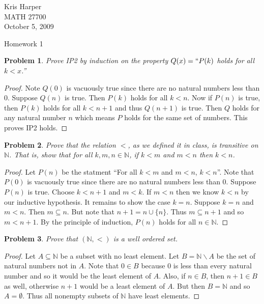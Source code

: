 \documentclass{article}
\newtheorem{problem}{Problem}
\begin{document}
\begin{flushright}
Kris Harper\\

MATH 27700\\

October 5, 2009
\end{flushright}

\begin{center}
Homework 1
\end{center}

\begin{problem}
Prove IP2 by induction on the property $Q(x) = ``P(k)$ holds for all $k < x$.''
\end{problem}
\begin{proof}
Note $Q(0)$ is vacuously true since there are no natural numbers less than $0$. Suppose $Q(n)$ is true. Then $P(k)$ holds for all $k < n$. Now if $P(n)$ is true, then $P(k)$ holds for all $k < n+1$ and thus $Q(n+1)$ is true. Then $Q$ holds for any natural number $n$ which means $P$ holds for the same set of numbers. This proves IP2 holds.
\end{proof}

\begin{problem}
Prove that the relation $<$, as we defined it in class, is transitive on $\mathbb{N}$. That is, show that for all $k, m, n \in \mathbb{N}$, if $k < m$ and $m < n$ then $k < n$.
\end{problem}
\begin{proof}
Let $P(n)$ be the statment ``For all $k < m$ and $m < n$, $k < n$''. Note that $P(0)$ is vacuously true since there are no natural numbers less than $0$. Suppose $P(n)$ is true. Choose $k < n+1$ and $m < k$. If $m < n$ then we know $k < n$ by our inductive hypothesis. It remains to show the case $k = n$. Suppose $k = n$ and $m < n$. Then $m \subseteq n$. But note that $n + 1 = n \cup \{n\}$. Thus $m \subseteq n+1$ and so $m < n+1$. By the principle of induction, $P(n)$ holds for all $n \in \mathbb{N}$.
\end{proof}

\begin{problem}
Prove that $(\mathbb{N}, <)$ is a well ordered set.
\end{problem}
\begin{proof}
Let $A \subseteq \mathbb{N}$ be a subset with no least element. Let $B = \mathbb{N} \backslash A$ be the set of natural numbers not in $A$. Note that $0 \in B$ because $0$ is less than every natural number and so it would be the least element of $A$. Also, if $n \in B$, then $n+1 \in B$ as well, otherwise $n+1$ would be a least element of $A$. But then $B = \mathbb{N}$ and so $A = \emptyset$. Thus all nonempty subsets of $\mathbb{N}$ have least elements.
\end{proof}
\end{document}
